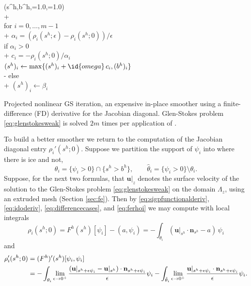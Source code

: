 \documentclass[letterpaper,final,12pt,reqno]{amsart}
\theoremstyle{claim}
\newcommand{\eps}{\epsilon}
\newcommand{\bn}{\mathbf{n}}
\newcommand{\bu}{\mathbf{u}}
\newcommand{\ip}[2]{\left(#1,#2\right)}
\numberwithin{equation}{section}
\numberwithin{figure}{section}
\numberwithin{table}{section}
\numberwithin{theorem}{section}
\begin{document}
\begin{pcode}[ht]
\begin{pseudo*}
(s^h,b^h,=1.0,=1.0)\text{:} \\+
     \\
    for $i = 0,\dots,m-1$ \\+
        $\alpha_i = (\rho_i(s^h; \eps) - \rho_i(s^h; 0))/\eps$  \qquad\qquad {} \\
        if $\alpha_i > 0$ \\+
            $c_i = - \rho_i(s^h; 0) / \alpha_i$ \\
            $(s^h)_i \gets \max\{(s^h)_i + \id{omega}\,c_i, (b^h)_i\}$ \\-
        else \\+
            $(s^h)_i \gets \beta_i$ \qquad\qquad {}
\end{pseudo*}
\caption{Projected nonlinear GS iteration, an expensive in-place smoother using a finite-difference (FD) derivative for the Jacobian diagonal.  Glen-Stokes problem \eqref{eq:glenstokesweak} is solved $2m$ times per application of .}
\label{pc:pngsslow}
\end{pcode}

To build a better smoother we return to the computation of the Jacobian diagonal entry $\rho_i'(s^h; 0)$.  Suppose we partition the support of $\psi_i$ into where there is ice and not,
\begin{equation}
\theta_i = \{\psi_i > 0\} \cap \{s^h > b^h\}, \qquad {\hat\theta}_i = \{\psi_i > 0\} \setminus \theta_i.  \label{eq:thetasupport}
\end{equation}
Suppose, for the next two formulas, that $\bu|_{z}$ denotes the surface velocity of the solution to the Glen-Stokes problem \eqref{eq:glenstokesweak} on the domain $\Lambda_{z}$, using an extruded mesh (Section \ref{sec:fe}).  Then by \eqref{eq:sigpfunctionalderiv}, \eqref{eq:idoderiv}, \eqref{eq:differencecases}, and \eqref{eq:ferhoi} we may compute with local integrals
\begin{equation}
\rho_i(s^h; 0) = F^h(s^h)[\psi_i] - \ip{a}{\psi_i} = - \int_{\theta_i} (\bu|_{s^h} \cdot \bn_{s^h}- a)\, \psi_i  \label{eq:rhozero}
\end{equation}
and
\begin{align}
\rho_i'(s^h; 0) &= (F^h)'(s^h)[\psi_i,\psi_i]  \label{eq:rholocalderiv} \\
  &= - \int_{\theta_i} \lim_{\eps\to 0^+} \frac{(\bu|_{s^h+\eps\psi_i} - \bu|_{s^h}) \cdot \bn_{s^h+\eps\psi_i}}{\eps} \psi_i - \int_{{\hat\theta}_i} \lim_{\eps\to 0^+} \frac{\bu|_{s^h+\eps\psi_i} \cdot \bn_{s^h+\eps\psi_i}}{\eps} \psi_i.  \notag
\end{align}
\end{document}
